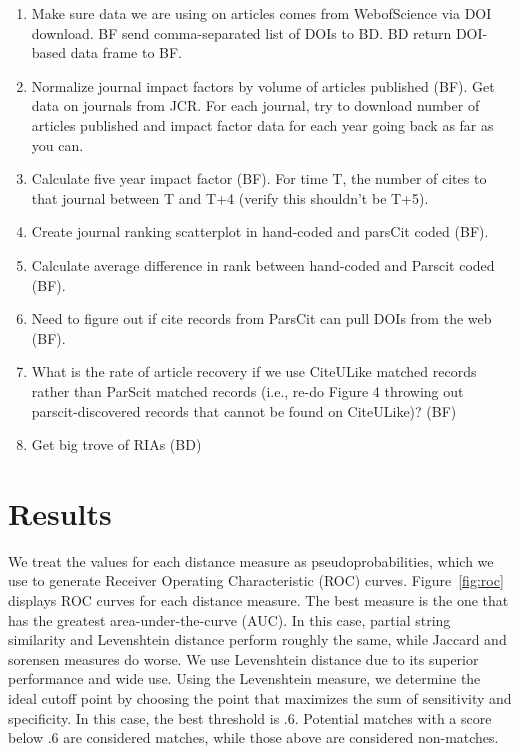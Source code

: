 \documentclass[12pt]{article}
\begin{document}
\begin{enumerate}
\item Make sure data we are using on articles comes from WebofScience via DOI download. BF send comma-separated list of DOIs to BD. BD return DOI-based data frame to BF.
\item Normalize journal impact factors by volume of articles published (BF). Get data on journals from JCR. For each journal, try to download number of articles published and impact factor data for each year going back as far as you can.
\item Calculate five year impact factor (BF).  For time T, the number of cites to that journal between T and T+4 (verify this shouldn't be T+5).
\item Create journal ranking scatterplot in hand-coded and parsCit coded (BF).
\item Calculate average difference in rank between hand-coded and Parscit coded (BF).
\item Need to figure out if cite records from ParsCit can pull DOIs from the web (BF).
\item What is the rate of article recovery if we use CiteULike matched records rather than ParScit matched records (i.e., re-do Figure 4 throwing out parscit-discovered records that cannot be found on CiteULike)? (BF) 
\item Get big trove of RIAs (BD)
\end{enumerate}



\section{Results}
We treat the values for each distance measure as pseudoprobabilities, which we use to generate Receiver Operating Characteristic (ROC) curves. Figure~\ref{fig:roc} displays ROC curves for each distance measure. The best measure is the one that has the greatest area-under-the-curve (AUC). In this case, partial string similarity and Levenshtein distance perform roughly the same, while Jaccard and sorensen measures do worse. We use Levenshtein distance due to its superior performance and wide use. Using the Levenshtein measure, we determine the ideal cutoff point by choosing the point that maximizes the sum of sensitivity and specificity. In this case, the best threshold is .6. Potential matches with a score below .6 are considered matches, while those above are considered non-matches.
\end{document}
